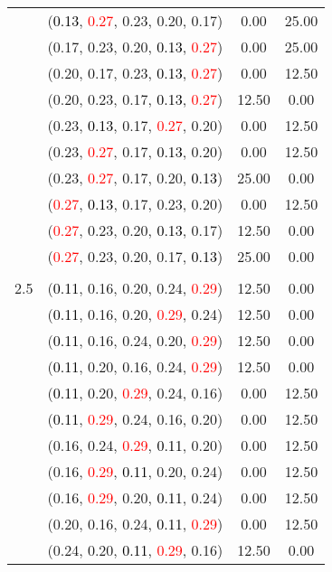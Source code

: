\documentclass[10pt,a4paper]{report}
\begin{document}
\begin{center}
\begin{longtable}{clcc}
			&(\textcolor{black}{0.13}, \textcolor{red}{0.27}, 0.23, 0.20, 0.17)&0.00&25.00\\
			&(0.17, 0.23, 0.20, \textcolor{black}{0.13}, \textcolor{red}{0.27})&0.00&25.00\\
			&(0.20, 0.17, 0.23, \textcolor{black}{0.13}, \textcolor{red}{0.27})&0.00&12.50\\
			&(0.20, 0.23, 0.17, \textcolor{black}{0.13}, \textcolor{red}{0.27})&12.50&0.00\\
			&(0.23, \textcolor{black}{0.13}, 0.17, \textcolor{red}{0.27}, 0.20)&0.00&12.50\\
			&(0.23, \textcolor{red}{0.27}, 0.17, \textcolor{black}{0.13}, 0.20)&0.00&12.50\\
			&(0.23, \textcolor{red}{0.27}, 0.17, 0.20, \textcolor{black}{0.13})&25.00&0.00\\
			&(\textcolor{red}{0.27}, \textcolor{black}{0.13}, 0.17, 0.23, 0.20)&0.00&12.50\\
			&(\textcolor{red}{0.27}, 0.23, 0.20, \textcolor{black}{0.13}, 0.17)&12.50&0.00\\
			&(\textcolor{red}{0.27}, 0.23, 0.20, 0.17, \textcolor{black}{0.13})&25.00&0.00\\
		&&&\\
		2.5			&(\textcolor{black}{0.11}, 0.16, 0.20, 0.24, \textcolor{red}{0.29})&12.50&0.00\\
			&(\textcolor{black}{0.11}, 0.16, 0.20, \textcolor{red}{0.29}, 0.24)&12.50&0.00\\
			&(\textcolor{black}{0.11}, 0.16, 0.24, 0.20, \textcolor{red}{0.29})&12.50&0.00\\
			&(\textcolor{black}{0.11}, 0.20, 0.16, 0.24, \textcolor{red}{0.29})&12.50&0.00\\
			&(\textcolor{black}{0.11}, 0.20, \textcolor{red}{0.29}, 0.24, 0.16)&0.00&12.50\\
			&(\textcolor{black}{0.11}, \textcolor{red}{0.29}, 0.24, 0.16, 0.20)&0.00&12.50\\
			&(0.16, 0.24, \textcolor{red}{0.29}, \textcolor{black}{0.11}, 0.20)&0.00&12.50\\
			&(0.16, \textcolor{red}{0.29}, \textcolor{black}{0.11}, 0.20, 0.24)&0.00&12.50\\
			&(0.16, \textcolor{red}{0.29}, 0.20, \textcolor{black}{0.11}, 0.24)&0.00&12.50\\
			&(0.20, 0.16, 0.24, \textcolor{black}{0.11}, \textcolor{red}{0.29})&0.00&12.50\\
			&(0.24, 0.20, \textcolor{black}{0.11}, \textcolor{red}{0.29}, 0.16)&12.50&0.00\\

\end{longtable}
\end{center}
\end{document}

